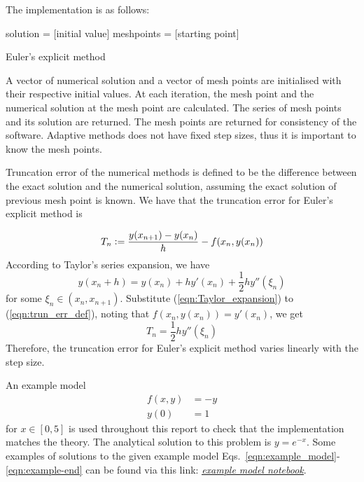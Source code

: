 The implementation is as follows:

\begin{algorithm}[H]
    \SetAlgoLined
    solution = [initial value]\;
    meshpoints = [starting point]\;
    \;
\caption{Euler's explicit method}
\end{algorithm}

A vector of numerical solution and a vector of mesh points are initialised with their respective initial values. At each iteration, the mesh point and the numerical solution at the mesh point are calculated. The series of mesh points and its solution are returned. The mesh points are returned for consistency of the software. Adaptive methods does not have fixed step sizes, thus it is important to know the mesh points. 

Truncation error of the numerical methods is defined to be the difference between the exact solution and the numerical solution, assuming the exact solution of previous mesh point is known. We have that the truncation error for Euler's explicit method is

\begin{equation}
\label{eqn:trun_err_def}
    T_n \vcentcolon= \frac{y(x_{n+1}) - y(x_{n})}{h} - f(x_n, y(x_n))
\end{equation}
According to Taylor's series expansion, we have 
\begin{equation}
\label{eqn:Taylor_expansion}
    y(x_n + h) = y(x_n) + hy'(x_n) + \frac{1}{2}hy''(\xi_n)
\end{equation}
for some $\xi_n \in (x_n, x_{n+1})$. Substitute (\ref{eqn:Taylor_expansion}) to (\ref{eqn:trun_err_def}), noting that $f(x_n, y(x_n)) = y'(x_n)$, we get
\begin{equation}
    T_n = \frac{1}{2}hy''(\xi_n)
\end{equation}
Therefore, the truncation error for Euler's explicit method varies linearly with the step size.

An example model 
\begin{align}
\label{eqn:example_model}
    f(x,y) &= -y \\
    y(0) &= 1 \label{eqn:example-end}
\end{align}
for $x \in [0, 5]$ is used throughout this report to check that the implementation matches the theory. The analytical solution to this problem is $y = e^{-x}$. Some examples of solutions to the given example model Eqs.~\eqref{eqn:example_model}-\eqref{eqn:example-end} can be found via this link: \href{https://nbviewer.jupyter.org/github/FarmHJ/numerical-solver/blob/main/examples/solver_convergence.ipynb}{\underline{\emph{example model notebook}}}. 

